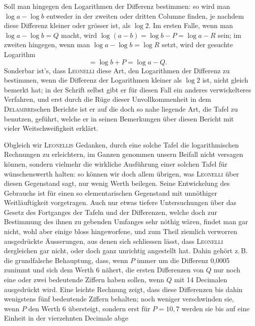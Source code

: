 Soll man hingegen den Logarithmen der Differenz bestimmen: so wird man $\log a - \log b$ entweder in der zweiten oder dritten Columne finden, je nachdem diese Differenz kleiner oder grösser ist, als $\log 2$. Im ersten Falle, wenn man $\log a - \log b = Q$ macht, wird $\log(a-b) = \log b - P = \log a - R$ sein; im zweiten hingegen, wenn man $\log a - \log b = \log R$ setzt, wird der gesuchte Logarithm
\[
= \log b + P = \log a - Q.
\]
Sonderbar ist’s, dass \textsc{Leonelli} diese Art, den Logarithmen der Differenz zu bestimmen, wenn die Differenz der Logarithmen kleiner als $\log 2$ ist, nicht gleich bemerkt hat; in der Schrift selbst gibt er für diesen Fall ein anderes verwickelteres Verfahren, und erst durch die Rüge dieser Unvollkommenheit in dem \textsc{Delambre}schen Berichte ist er auf die doch so nahe liegende Art, die Tafel zu benutzen, geführt, welche er in seinen Bemerkungen über diesen Bericht mit vieler Weitschweifigkeit erklärt.

Obgleich wir \textsc{Leonellis} Gedanken, durch eine solche Tafel die logarithmischen Rechnungen zu erleichtern, im Ganzen genommen unsern Beifall nicht versagen können, sondern vielmehr die wirkliche Ausführung einer solchen Tafel für wünschenswerth halten: so können wir doch allem übrigen, was \textsc{Leonelli} über diesen Gegenstand sagt, nur wenig Werth beilegen. Seine Entwickelung des Gebrauchs ist für einen so elementarischen Gegenstand mit unnöthiger Weitläuftigkeit vorgetragen. Auch nur etwas tiefere Untersuchungen über das Gesetz des Fortganges der Tafeln und der Differenzen, welche doch zur Bestimmung des ihnen zu gebenden Umfanges sehr nöthig wären, findet man gar nicht, wohl aber einige bloss hingeworfene, und zum Theil ziemlich verworren ausgedrückte Äusserungen, aus denen sich schliessen lässt, dass \textsc{Leonelli} dergleichen gar nicht, oder doch ganz unrichtig angestellt hat. Dahin gehört z.\,B. die grundfalsche Behauptung, dass, wenn $P$ immer um die Differenz 0,0005 zunimmt und sich dem Werth 6 nähert, die ersten Differenzen von $Q$ nur noch eine oder zwei bedeutende Ziffern haben sollen, wenn $Q$ mit 14 Decimalen ausgedrückt wird. Eine leichte Rechnung zeigt, dass diese Differenzen bis dahin wenigstens fünf bedeutende Ziffern behalten; noch weniger verschwinden sie, wenn $P$ den Werth 6 übersteigt, sondern erst für $P = 10,7$ werden sie bis auf eine Einheit in der vierzehnten Decimale abge%

